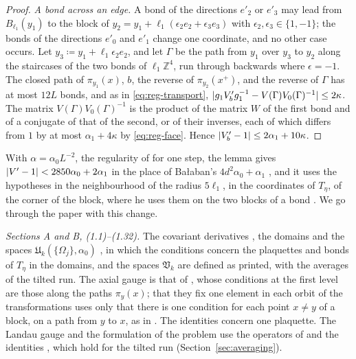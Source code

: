 \documentclass[11pt]{preprint}
\DeclarePairedDelimiter{\abs}{\lvert}{\rvert}
\numberwithin{equation}{section}
\theoremstyle{definition}
\theoremstyle{remark}
\theoremstyle{plain}
\begin{document}
\begin{proof}
\emph{A bond across an edge.} A bond of the directions $e'_2$ or $e'_3$ may lead from $B_{\ell_1}(y_1)$ to the block of $y_2 = y_1 + \ell_1(\epsilon_2e_2 + \epsilon_3e_3)$ with $\epsilon_2, \epsilon_3 \in \{ 1, -1 \}$; the bonds of the directions $e'_0$ and $e'_1$ change one coordinate, and no other case occurs. Let $y_3 \coloneqq y_1 + \ell_1\epsilon_2e_2$, and let $\Gamma$ be the path from $y_1$ over $y_3$ to $y_2$ along the staircases of the two bonds of $\ell_1\mathbb Z^4$, run through backwards where $\epsilon = -1$. The closed path of $\pi_{y_1}(x)$, $b$, the reverse of $\pi_{y_2}(x^+)$, and the reverse of $\Gamma$ has at most $12L$ bonds, and as in \eqref{eq:reg-transport}, $\abs{g_1V'_bg_1^{-1} - V(\Gamma)V_0(\Gamma)^{-1}} \leq 2\kappa$. The matrix $V(\Gamma)V_0(\Gamma)^{-1}$ is the product of the matrix $W$ of the first bond and of a conjugate of that of the second, or of their inverses, each of which differs from $1$ by at most $\alpha_1 + 4\kappa$ by \eqref{eq:reg-face}. Hence $\abs{V'_b - 1} \leq 2\alpha_1 + 10\kappa$.
\end{proof}

With $\alpha = \alpha_0L^{-2}$, the regularity of \cite[(1.7)]{BalabanREG} for one step, the lemma gives $\abs{V' - 1} < 2850\alpha_0 + 2\alpha_1$ in the place of Ba{\l}aban's $4d^2\alpha_0 + \alpha_1$ \cite[(1.25)]{BalabanREG}, and it uses the hypotheses in the neighbourhood of the radius $5\ell_1$, in the coordinates of $T_\eta$, of the corner of the block, where he uses them on the two blocks of a bond \cite[p.~80]{BalabanREG}. We go through the paper with this change.

\emph{Sections A and B, (1.1)--(1.32).} The covariant derivatives \cite[(1.1), (1.2)]{BalabanREG}, the domains and the spaces $\mathfrak U_k(\{ \Omega_j \}, \alpha_0)$ \cite[(1.3)--(1.11)]{BalabanREG}, in which the conditions concern the plaquettes and bonds of $T_\eta$ in the domains, and the spaces $\mathfrak V_k$ \cite[(1.12)--(1.14)]{BalabanREG} are defined as printed, with the averages of the tilted run. The axial gauge \cite[(1.15), (1.19)]{BalabanREG} is that of \cite[(64)--(72)]{BalabanAVG}, whose conditions at the first level are those along the paths $\pi_y(x)$; that they fix one element in each orbit of the transformations \cite[(1.14)]{BalabanREG} uses only that there is one condition for each point $x \neq y$ of a block, on a path from $y$ to $x$, as in \cite[(1.17)]{BalabanREG}. The identities \cite[(1.21), (1.22)]{BalabanREG} concern one plaquette. The Landau gauge \cite[(1.27)]{BalabanREG} and the formulation \cite[(1.28)--(1.32)]{BalabanREG} of the problem use the operators of \cite{BalabanPBG} and the identities \cite[(87), (92), (97), (99), (105)]{BalabanAVG}, which hold for the tilted run (Section~\ref{sec:averaging}).
\end{document}
